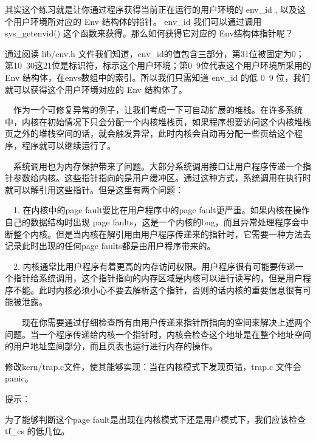 \begin{ExerciseList}
  其实这个练习就是让你通过程序获得当前正在运行的用户环境的 env\_id , 以及这个用户环境所对应的 Env 结构体的指针。 env\_id 我们可以通过调用 sys\_getenvid() 这个函数来获得。那么如何获得它对应的 Env结构体指针呢？

  通过阅读 lib/env.h 文件我们知道，env\_id的值包含三部分，第31位被固定为0；第10~30这21位是标识符，标示这个用户环境；第0~9位代表这个用户环境所采用的 Env 结构体，在envs数组中的索引。所以我们只需知道 env\_id 的低 0~9 位，我们就可以获得这个用户环境对应的 Env 结构体了。


　作为一个可修复异常的例子，让我们考虑一下可自动扩展的堆栈。在许多系统中，内核在初始情况下只会分配一个内核堆栈页，如果程序想要访问这个内核堆栈页之外的堆栈空间的话，就会触发异常，此时内核会自动再分配一些页给这个程序，程序就可以继续运行了。

　系统调用也为内存保护带来了问题。大部分系统调用接口让用户程序传递一个指针参数给内核。这些指针指向的是用户缓冲区。通过这种方式，系统调用在执行时就可以解引用这些指针。但是这里有两个问题：

　1. 在内核中的page fault要比在用户程序中的page fault更严重。如果内核在操作自己的数据结构时出现 page faults，这是一个内核的bug，而且异常处理程序会中断整个内核。但是当内核在解引用由用户程序传递来的指针时，它需要一种方法去记录此时出现的任何page faults都是由用户程序带来的。

　2. 内核通常比用户程序有着更高的内存访问权限。用户程序很有可能要传递一个指针给系统调用，这个指针指向的内存区域是内核可以进行读写的，但是用户程序不能。此时内核必须小心不要去解析这个指针，否则的话内核的重要信息很有可能被泄露。

　　现在你需要通过仔细检查所有由用户传递来指针所指向的空间来解决上述两个问题。当一个程序传递给内核一个指针时，内核会检查这个地址是在整个地址空间的用户地址空间部分，而且页表也运行进行内存的操作。

修改kern/trap.c文件，使其能够实现：当在内核模式下发现页错，trap.c 文件会panic。

提示：

为了能够判断这个page fault是出现在内核模式下还是用户模式下，我们应该检查 tf\_cs 的低几位。


\end{ExerciseList}
